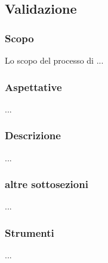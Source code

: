 \subsection{Validazione}
    \subsubsection{Scopo}
        Lo scopo del processo di ...
    \subsubsection{Aspettative}
        ...
    \subsubsection{Descrizione}
        ...
    \subsubsection{altre sottosezioni}
        ...
    \subsubsection{Strumenti}
        ...